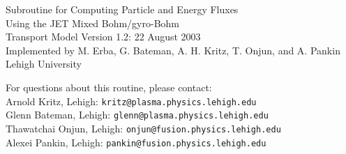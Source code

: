\newpage
\begin{center}
{\LARGE Subroutine for Computing Particle and Energy Fluxes\\ \vskip8pt
Using the JET Mixed Bohm/gyro-Bohm\\ \vskip8pt
Transport Model
}\vskip1.0cm
Version 1.2: 22 August 2003 \\
Implemented by M. Erba, G. Bateman, A. H. Kritz, T. Onjun, and A. Pankin\\
 Lehigh University
\end{center}
For questions about this routine, please contact: \\
Arnold Kritz, Lehigh: {\tt kritz@plasma.physics.lehigh.edu}\\
Glenn Bateman, Lehigh: {\tt glenn@plasma.physics.lehigh.edu}\\
Thawatchai Onjun, Lehigh: {\tt onjun@fusion.physics.lehigh.edu}\\
Alexei Pankin, Lehigh: {\tt pankin@fusion.physics.lehigh.edu}\vskip8pt


